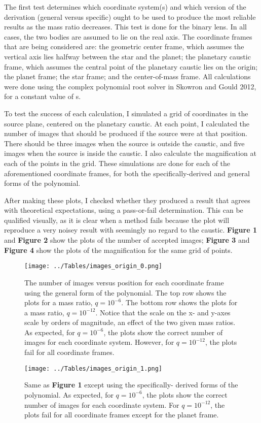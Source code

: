 \documentclass{article}
\begin{document}

The first test determines which coordinate system(s) and which version of the
derivation (general versus specific) ought to be used to produce the most
reliable results as the mass ratio decreases. This test is done for
the binary lens. In all cases, the two bodies are assumed to lie on the real
axis. The coordinate frames that are being considered are: the geometric center
frame, which assumes the vertical axis lies halfway between the star and the
planet; the planetary caustic frame, which assumes the central point of the
planetary caustic lies on the origin; the planet frame; the star frame; and
the center-of-mass frame. All calculations were done using the complex
polynomial root solver in Skowron and Gould 2012, for a constant value of s.

To test the success of each calculation, I simulated a grid of coordinates
in the source plane, centered on the planetary caustic. At each point, I
calculated the number of images that should be produced if the source were
at that position. There should be three images when the source is outside
the caustic, and five images when the source is inside the caustic. I also
calculate the magnification at each of the points in the grid. These
simulations are done for each of the aforementioned coordinate frames, for
both the specifically-derived and general forms of the polynomial.

After making these plots, I checked whether they produced a result that
agrees with theoretical expectations, using a pass-or-fail determination.
This can be qualified visually, as it is clear when a method fails because the
plot will reproduce a very noisey result with seemingly no regard to the
caustic. \textbf{Figure 1} and \textbf{Figure 2} show the plots of the
number of accepted images; \textbf{Figure 3} and \textbf{Figure 4} show
the plots of the magnification for the same grid of points.

\begin{figure}
	\texttt{[image: ../Tables/images\_origin\_0.png]}
	\caption{The number of images versus position for each coordinate
	frame using the general form of the polynomial. The top row shows
	the plots for a mass ratio, $q=10^{-6}$. The bottom row shows the
	plots for a mass ratio, $q=10^{-12}$. Notice that the scale on the
	x- and y-axes scale by orders of magnitude, an effect of the two
	given mass ratios. As expected, for $q=10^{-6}$, the plots show the
	correct number of images for each coordinate system. However, for
	$q=10^{-12}$, the plots fail for all coordinate frames.}

	\vspace*{\floatsep}

	\texttt{[image: ../Tables/images\_origin\_1.png]}
	\caption{Same as \textbf{Figure 1} except using the specifically-
	derived forms of the polynomial. As	expected, for $q=10^{-6}$, the
	plots show the correct number of images for each coordinate system.
	For $q=10^{-12}$, the plots fail for all coordinate frames except for
	the planet frame.}
\end{figure}
\end{document}
